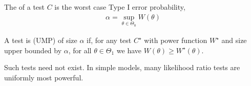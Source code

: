 \begin{definition}[Size]
	The  of a test $C$ is the worst case Type I error probability,
	\begin{align*}
		\alpha = \sup_{\theta \in \Theta_0} W(\theta)
	\end{align*}
\end{definition} 

\begin{definition}
	A test is  (UMP) of size $\alpha$ if, for any test $C^\star$ with power function $W^\star$ and size upper bounded by $\alpha$, for all $\theta \in \Theta_1$ we have $W(\theta) \geq W^\star(\theta)$.
\end{definition} 

\begin{note}
	Such tests need not exist.
	In simple models, many likelihood ratio tests are uniformly most powerful.
\end{note} 

